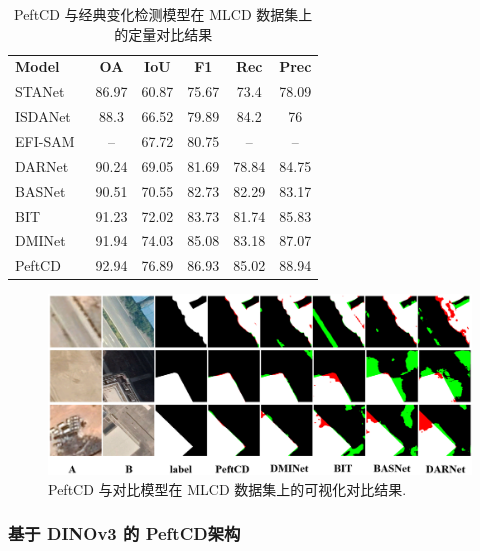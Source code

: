 \begin{table}[!htb]
\centering
\caption{PeftCD 与经典变化检测模型在 MLCD 数据集上的定量对比结果}
\label{tab:peftcd_mlcd}
\begin{tabular}{l c c c c c}
\toprule
\textbf{Model} & \textbf{OA} & \textbf{IoU} & \textbf{F1} & \textbf{Rec} & \textbf{Prec} \\
STANet~\cite{chen_spatial-temporal_2020}         & 86.97 & 60.87 & 75.67 & 73.4  & 78.09 \\
ISDANet~\cite{h_ren_interactive_2025}            & 88.3  & 66.52 & 79.89 & 84.2  & 76    \\
EFI-SAM~\cite{Huang2025SAMBasedEF}          & -- & 67.72 & 80.75 & -- & -- \\
DARNet~\cite{li_densely_2022}         & 90.24 & 69.05 & 81.69 & 78.84 & 84.75 \\
BASNet~\cite{z_wang_bitemporal_2024}         & 90.51 & 70.55 & 82.73 & 82.29 & 83.17 \\
BIT~\cite{chen_remote_2022}            & 91.23 & 72.02 & 83.73 & 81.74 & 85.83 \\
DMINet~\cite{feng_change_2023}         & 91.94 & 74.03 & 85.08 & 83.18 & 87.07 \\
\midrule
PeftCD & 92.94 & 76.89 & 86.93 & 85.02 & 88.94 \\
\bottomrule
\end{tabular}
\end{table}

\begin{figure}[!htb]
  \centering
  \includegraphics[width=\textwidth]{paper_figures/基于AI基础模型微调的变化检测模型研究/PeftCD/peftcd_mlcd.png}
  \caption{PeftCD 与对比模型在 MLCD 数据集上的可视化对比结果.}
  \label{fig:peftcd_mlcd}
\end{figure}


\subsubsection{基于 DINOv3 的 PeftCD架构}

